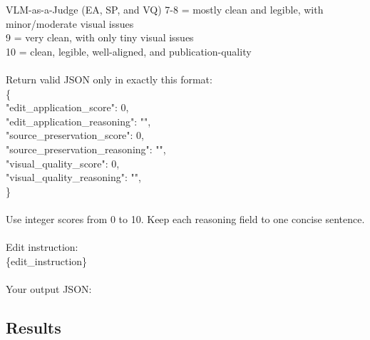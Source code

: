 \begin{PromptBox}{VLM-as-a-Judge (EA, SP, and VQ)}
7-8 = mostly clean and legible, with minor/moderate visual issues \\
9 = very clean, with only tiny visual issues \\
10 = clean, legible, well-aligned, and publication-quality \\\\
Return valid JSON only in exactly this format: \\
{\ttfamily
\{ \\
\hspace*{1.5em}"edit\_application\_score": 0, \\
\hspace*{1.5em}"edit\_application\_reasoning": "", \\
\hspace*{1.5em}"source\_preservation\_score": 0, \\
\hspace*{1.5em}"source\_preservation\_reasoning": "", \\
\hspace*{1.5em}"visual\_quality\_score": 0, \\
\hspace*{1.5em}"visual\_quality\_reasoning": "", \\
\}
}\\\\
Use integer scores from 0 to 10. Keep each reasoning field to one concise sentence. \\\\
Edit instruction: \\
\{edit\_instruction\} \\\\
Your output JSON:
\label{fig:prompt_evaluation}
\end{PromptBox}

\subsection{Results}
\label{subsec:Results}

